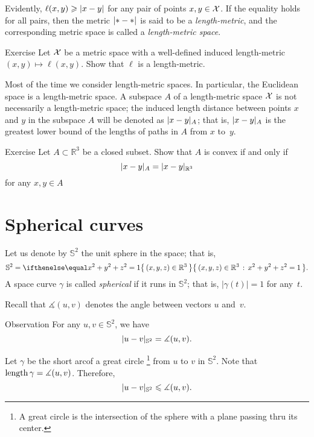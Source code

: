 Evidently, $\ell(x,y)\ge \dist{x}{y}{}$ for any pair of points $x,y\in \mathcal{X}$.
If the equality holds for all pairs, then the metric $\dist{{*}}{{*}}{}$ is said to be a \emph{length-metric}, and the corresponding metric space is called a \index{}\emph{length-metric space}.

\begin{thm}{Exercise}\label{ex:induced-is-length}
Let $\mathcal{X}$ be a metric space with a well-defined induced length-metric $(x,y)\mapsto \ell(x,y)$.
Show that $\ell$ is a length-metric.
\end{thm}

Most of the time we consider length-metric spaces.
In particular, the Euclidean space is a length-metric space.
A subspace $A$ of a length-metric space $\mathcal{X}$ is not necessarily a length-metric space;
the induced length distance between points $x$ and $y$ in the subspace $A$ will be denoted as $\dist{x}{y}A$;
that is, $\dist{x}{y}A$ is the greatest lower bound of the lengths of paths in $A$ from $x$ to~$y$.

\begin{thm}{Exercise}\label{ex:intrinsic-convex}
Let $A\subset \mathbb{R}^3$ be a closed subset.
Show that $A$ is convex if and only if
\[\dist{x}{y}A=\dist{x}{y}{\mathbb{R}^3}\]
for any $x,y\in A$
\end{thm}


\section{Spherical curves}

Let us denote by $\mathbb{S}^2$ the unit sphere in the space; that is,
\[\mathbb{S}^2=\set{(x,y,z)\in\mathbb{R}^3}{x^2+y^2+z^2=1}.\]
A space curve $\gamma$ is called \emph{spherical} if it runs in $\mathbb{S}^2$;
that is, $|\gamma(t)|=1$ for any~$t$.

Recall that $\measuredangle(u,v)$ denotes the angle between vectors $u$ and~$v$.

\begin{thm}{Observation}\label{obs:S2-length}
For any $u,v\in \mathbb{S}^2$, we have
\[\dist{u}{v}{\mathbb{S}^2}=\measuredangle(u,v).\]

\end{thm}

Let $\gamma$ be the short arcof a great circle%
\footnote{A great circle is the intersection of the sphere with a plane passing thru its center.}
from $u$ to $v$ in $\mathbb{S}^2$.
Note that $\mathop{\rm length}\nolimits\gamma=\measuredangle(u,v)$.
Therefore,
\[\dist{u}{v}{\mathbb{S}^2}\le\measuredangle(u,v).\]

